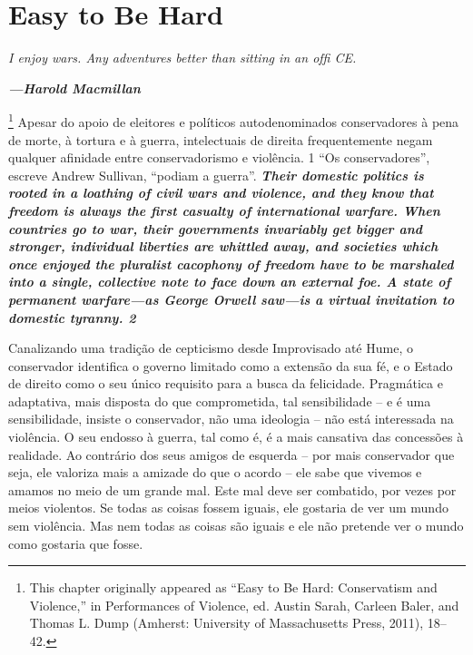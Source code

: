  
 \chapter{Easy to Be Hard}  

 \label{Easy to Be Hard}  
 
 
\par
 
 
 \textit{	I enjoy wars. Any adventures better than sitting in an ofﬁ CE.}  

 
\par
 
 
 
\par
 

 \textbf{\textit{	—Harold Macmillan} }  

 
\par
 

 \footnote{This chapter originally appeared as “Easy to Be Hard: Conservatism and Violence,” in Performances of Violence, ed. Austin Sarah, Carleen Baler, and Thomas L. Dump (Amherst: University of Massachusetts Press, 2011), 18–42.}  
Apesar do apoio de eleitores e políticos autodenominados conservadores à pena de morte, à tortura e à guerra, intelectuais de direita frequentemente negam qualquer afinidade entre conservadorismo e violência.
 {\color{blue} 1}  
“Os conservadores”, escreve Andrew Sullivan, “podiam a guerra”.
 \textbf{\textit{Their domestic politics is rooted in a loathing of civil wars and violence, and they know that freedom is always the first casualty of international warfare. When countries go to war, their governments invariably get bigger and stronger, individual liberties are whittled away, and societies which once enjoyed the pluralist cacophony of freedom have to be marshaled into a single, collective note to face down an external foe. A state of permanent warfare—as George Orwell saw—is a virtual invitation to domestic tyranny. {{\color{blue} 2} } } } 

 
\par
 
Canalizando uma tradição de cepticismo desde Improvisado até Hume, o conservador identifica o governo limitado como a extensão da sua fé, e o Estado de direito como o seu único requisito para a busca da felicidade. Pragmática e adaptativa, mais disposta do que comprometida, tal sensibilidade – e é uma sensibilidade, insiste o conservador, não uma ideologia – não está interessada na violência. O seu endosso à guerra, tal como é, é a mais cansativa das concessões à realidade. Ao contrário dos seus amigos de esquerda – por mais conservador que seja, ele valoriza mais a amizade do que o acordo – ele sabe que vivemos e amamos no meio de um grande mal. Este mal deve ser combatido, por vezes por meios violentos. Se todas as coisas fossem iguais, ele gostaria de ver um mundo sem violência. Mas nem todas as coisas são iguais e ele não pretende ver o mundo como gostaria que fosse.
 
